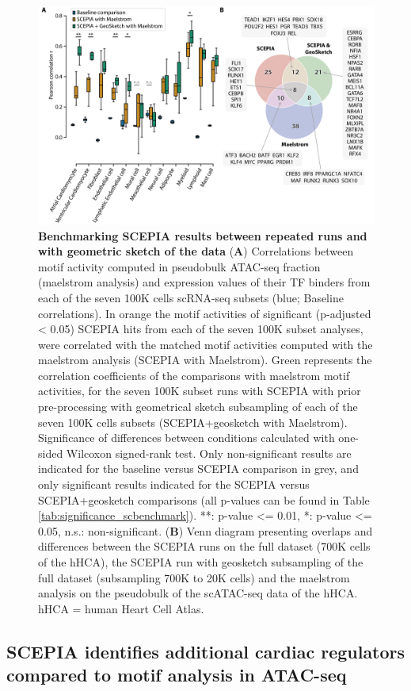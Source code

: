 \begin{figure}
    \centering
    \includegraphics[width=0.75\linewidth]{ch.scepia/imgs/OverlappingHitsBetweenSCEPIAGEOANDMAELSTROM_BlackMyriad_onlySign_baselineNS_v11_Figure4.png}
    \caption{\textbf{Benchmarking SCEPIA results between repeated runs and with geometric sketch of the data} (\textbf{A}) Correlations between motif activity computed in pseudobulk ATAC-seq fraction (maelstrom analysis) and expression values of their TF binders from each of the seven 100K cells scRNA-seq subsets (blue; Baseline correlations). In orange the motif activities of significant (p-adjusted < 0.05) SCEPIA hits from each of the seven 100K subset analyses, were correlated with the matched motif activities computed with the maelstrom analysis (SCEPIA with Maelstrom). Green represents the correlation coefficients of the comparisons with maelstrom motif activities, for the seven 100K subset runs with SCEPIA with prior pre-processing with geometrical sketch subsampling of each of the seven 100K cells subsets (SCEPIA+geosketch with Maelstrom). Significance of differences between conditions calculated with one-sided Wilcoxon signed-rank test. Only non-significant results are indicated for the baseline versus SCEPIA comparison in grey, and only significant results indicated for the SCEPIA versus SCEPIA+geosketch comparisons (all p-values can be found in Table \ref{tab:significance_scbenchmark}).  **: p-value <= 0.01, *: p-value <= 0.05, n.s.: non-significant. (\textbf{B}) Venn diagram presenting overlaps and differences between the SCEPIA runs on the full dataset (700K cells of the hHCA), the SCEPIA run with geosketch subsampling of the full dataset (subsampling 700K to 20K cells) and the maelstrom analysis on the pseudobulk of the scATAC-seq data of the hHCA. hHCA = human Heart Cell Atlas.}
    \label{fig:sc_benchmark}
\end{figure}

\subsection{SCEPIA identifies additional cardiac regulators compared to motif analysis in ATAC-seq} 


